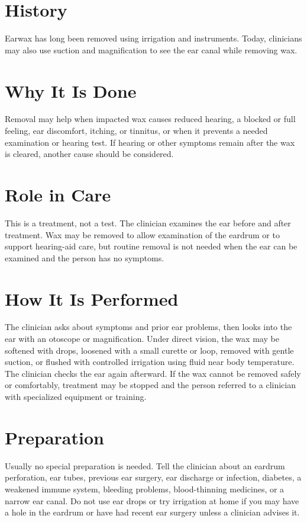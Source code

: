 \section*{History}
Earwax has long been removed using irrigation and instruments. Today, clinicians may also use suction and magnification to see the ear canal while removing wax.

\section*{Why It Is Done}
Removal may help when impacted wax causes reduced hearing, a blocked or full feeling, ear discomfort, itching, or tinnitus, or when it prevents a needed examination or hearing test. If hearing or other symptoms remain after the wax is cleared, another cause should be considered.

\section*{Role in Care}
This is a treatment, not a test. The clinician examines the ear before and after treatment. Wax may be removed to allow examination of the eardrum or to support hearing-aid care, but routine removal is not needed when the ear can be examined and the person has no symptoms.

\section*{How It Is Performed}
The clinician asks about symptoms and prior ear problems, then looks into the ear with an otoscope or magnification. Under direct vision, the wax may be softened with drops, loosened with a small curette or loop, removed with gentle suction, or flushed with controlled irrigation using fluid near body temperature. The clinician checks the ear again afterward. If the wax cannot be removed safely or comfortably, treatment may be stopped and the person referred to a clinician with specialized equipment or training.

\section*{Preparation}
Usually no special preparation is needed. Tell the clinician about an eardrum perforation, ear tubes, previous ear surgery, ear discharge or infection, diabetes, a weakened immune system, bleeding problems, blood-thinning medicines, or a narrow ear canal. Do not use ear drops or try irrigation at home if you may have a hole in the eardrum or have had recent ear surgery unless a clinician advises it.

